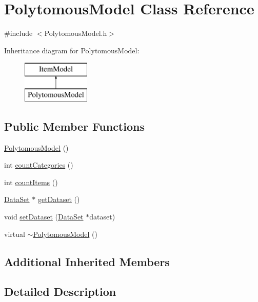 \hypertarget{classPolytomousModel}{}\section{Polytomous\+Model Class Reference}
\label{classPolytomousModel}


{\ttfamily \#include $<$Polytomous\+Model.\+h$>$}

Inheritance diagram for Polytomous\+Model\+:\begin{figure}[H]
\begin{center}
\leavevmode
\includegraphics[height=2.000000cm]{classPolytomousModel}
\end{center}
\end{figure}
\subsection*{Public Member Functions}
\begin{DoxyCompactItemize}
\item 
\hyperlink{classPolytomousModel_a7eb616216ec5dd988ca59fef6ce79fe6}{Polytomous\+Model} ()
\item 
int \hyperlink{classPolytomousModel_a1a65e5771d53f6921c48fdc41ea62961}{count\+Categories} ()
\item 
int \hyperlink{classPolytomousModel_a8828b2108445ef361a4af0a3aaf07e86}{count\+Items} ()
\item 
\hyperlink{classDataSet}{Data\+Set} $\ast$ \hyperlink{classPolytomousModel_a0e1aa66768478466b3e49a9f54ace8ba}{get\+Dataset} ()
\item 
void \hyperlink{classPolytomousModel_a71b943b552ae6842f94370698fc9ba0b}{set\+Dataset} (\hyperlink{classDataSet}{Data\+Set} $\ast$dataset)
\item 
virtual \hyperlink{classPolytomousModel_a4759a7fca25241fedb8499191ae775ca}{$\sim$\+Polytomous\+Model} ()
\end{DoxyCompactItemize}
\subsection*{Additional Inherited Members}


\subsection{Detailed Description}


